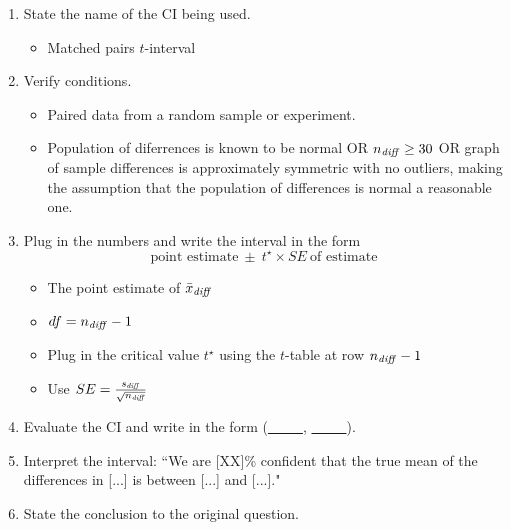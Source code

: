 \begin{termBox}{\vspace{-1mm}
\begin{enumerate}
\setlength{\itemsep}{0mm}
\item State the name of the CI being used.\vspace{-1.5mm}
\begin{itemize}
\setlength{\itemsep}{0mm}
\item Matched pairs $t$-interval
\end{itemize}
\item Verify conditions.\vspace{-1.5mm}
\begin{itemize}
\setlength{\itemsep}{0mm}
\item Paired data from a random sample or experiment.
\item Population of diferrences is known to be normal OR $n_{\text{\emph{diff}}}\ge 30$ OR graph of sample differences is approximately symmetric with no outliers, making the assumption that the population of differences is normal a reasonable one.
\end{itemize}
\item Plug in the numbers and write the interval in the form
$$\text{point estimate}\ \pm \ t^{\star} \times SE \ \text{of estimate}$$
\begin{itemize}
\setlength{\itemsep}{0mm}
\item The point estimate of $\bar{x}_{\text{\emph{diff}}}$
\item $df=n_{\text{\emph{diff}}}-1$
\item Plug in the critical value $t^{\star}$ using the $t$-table at row $n_{\text{\emph{diff}}}-1$
\item Use $SE = \frac{s_{\text{\emph{diff}}}}{\sqrt{n_{\text{\emph{diff}}}}}$
\end{itemize}
\item Evaluate the CI and write in the form (\underline{\ \ \ \ \ }, \underline{\ \ \ \ \ }).
\item Interpret the interval: ``We are [XX]\% confident that the true mean of the differences in [...] is between [...] and [...]."
\item State the conclusion to the original question.
\end{enumerate}}
\end{termBox}

